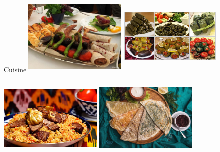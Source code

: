 \documentclass[hyperref={pdfpagemode=FullScreen}]{beamer}
\begin{document}
\begin{frame}{Cuisine}
\centering
\includegraphics[width=5cm, height=3.9cm]{img/cus01.jpg}
\includegraphics[width=5cm, height=3.9cm]{img/cus02.jpg}

\vspace{0.5mm}
\includegraphics[width=5cm, height=3.9cm]{img/cus03.jpg}
\includegraphics[width=5cm, height=3.9cm]{img/cus04.jpg}
\end{frame}
\end{document}
